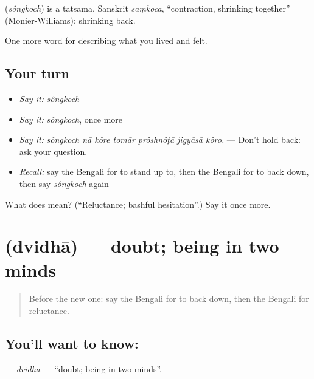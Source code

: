 \begin{cousinweb}
\textbf{} (\emph{sôngkoch}) is a tatsama, Sanskrit \emph{saṃkoca}, \textquotedblleft{}contraction, shrinking together\textquotedblright{} (Monier-Williams): shrinking back.
\end{cousinweb}

\begin{grammarlens}[title={What you've built}]
One more word for describing what you lived and felt.
\end{grammarlens}

\subsection*{Your turn}
\begin{itemize}
\raggedright
  \item \emph{Say it:} \emph{sôngkoch}
  \item \emph{Say it:} \emph{sôngkoch}, once more
  \item \emph{Say it:} \emph{sôngkoch nā kôre tomār prôshnôṭā jigyāsā kôro.} — Don't hold back: ask your question.
  \item \emph{Recall:} say the Bengali for to stand up to, then the Bengali for to back down, then say \emph{sôngkoch} again
\end{itemize}

\begin{tcolorbox}[breakable,colback=teal!4,colframe=teal!35!black,title={Before you move on}]
What does  mean? (\textquotedblleft{}Reluctance; bashful hesitation\textquotedblright{}.) Say it once more.
\end{tcolorbox}
\section[\texorpdfstring{\bn{দ্বিধা} (dvidhā)}{দ্বিধা (dvidhā)}]{ (dvidhā) — doubt; being in two minds}

\label{lesson:BN-C454-dvidha}



\begin{quote}
Before the new one: say the Bengali for to back down, then the Bengali for reluctance.
\end{quote}

\subsection*{You'll want to know: }
\textbf{} — \emph{dvidhā} — \textquotedblleft{}doubt; being in two minds\textquotedblright{}.

